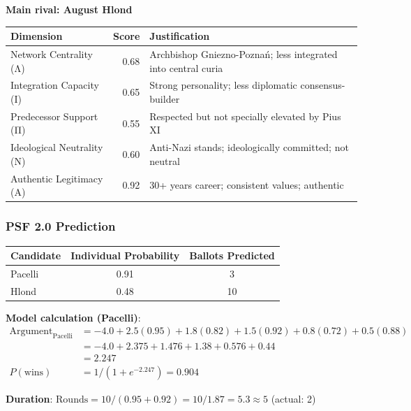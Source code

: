 \textbf{Main rival: August Hlond}

\begin{center}
\begin{tabular}{lrp{4cm}}
\toprule
\textbf{Dimension} & \textbf{Score} & \textbf{Justification} \\
\midrule
Network Centrality (Λ) & 0.68 & Archbishop Gniezno-Poznań; less integrated into central curia \\
Integration Capacity (Ι) & 0.65 & Strong personality; less diplomatic consensus-builder \\
Predecessor Support (Π) & 0.55 & Respected but not specially elevated by Pius XI \\
Ideological Neutrality (Ν) & 0.60 & Anti-Nazi stands; ideologically committed; not neutral \\
Authentic Legitimacy (Α) & 0.92 & 30+ years career; consistent values; authentic \\
\bottomrule
\end{tabular}
\end{center}

\subsubsection{PSF 2.0 Prediction}

\begin{center}
\begin{tabular}{lcc}
\toprule
\textbf{Candidate} & \textbf{Individual Probability} & \textbf{Ballots Predicted} \\
\midrule
Pacelli & 0.91 & 3 \\
Hlond & 0.48 & 10 \\
\bottomrule
\end{tabular}
\end{center}

\textbf{Model calculation (Pacelli)}:
\begin{equation}
\begin{split}
\text{Argument}_{\text{Pacelli}} &= -4.0 + 2.5(0.95) + 1.8(0.82) + 1.5(0.92) + 0.8(0.72) + 0.5(0.88) \\
&= -4.0 + 2.375 + 1.476 + 1.38 + 0.576 + 0.44 \\
&= 2.247 \\
P(\text{wins}) &= 1 / (1 + e^{-2.247}) = 0.904
\end{split}
\end{equation}

\textbf{Duration}: $\text{Rounds} = 10 / (0.95 + 0.92) = 10 / 1.87 = 5.3 \approx 5$ (actual: 2)

